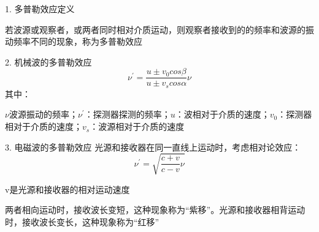 \documentclass[UTF8]{article}
\begin{document}
    1. 多普勒效应定义
    
    若波源或观察者，或两者同时相对介质运动，则观察者接收到的的频率和波源的振动频率不同的现象，称为多普勒效应

    2. 机械波的多普勒效应
    \[\nu^{'} = \frac{u\pm v_0cos\beta}{u\pm v_s cos\alpha}\nu\]
    其中：
    
    $\nu$波源振动的频率；$\nu^{'}$：探测器探测的频率；$u$：波相对于介质的速度；$v_0$：探测器相对于介质的速度；$v_s$：波源相对于介质的速度


    3. 电磁波的多普勒效应
    光源和接收器在同一直线上运动时，考虑相对论效应：
    \[\nu^{'} = \sqrt{\frac{c + v}{c - v}\nu}\]

    v是光源和接收器的相对运动速度

    两者相向运动时，接收波长变短，这种现象称为“紫移”。光源和接收器相背运动时，接收波长变长，这种现象称为“红移”
    
\end{document}
